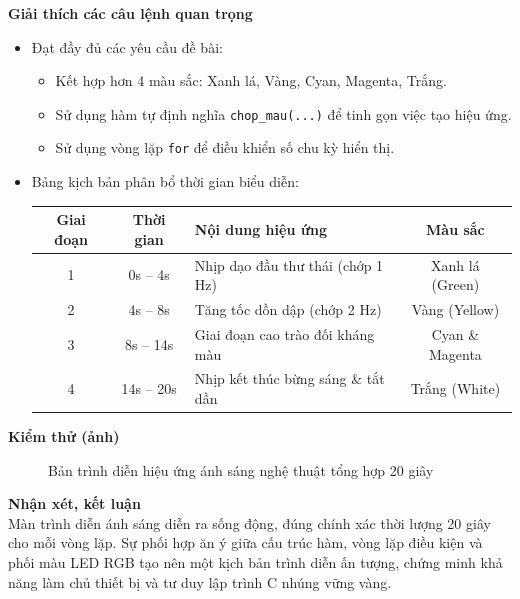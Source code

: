 \noindent\textbf{Giải thích các câu lệnh quan trọng}\\
\begin{itemize}
    \item Đạt đầy đủ các yêu cầu đề bài:
    \begin{itemize}
        \item Kết hợp hơn 4 màu sắc: Xanh lá, Vàng, Cyan, Magenta, Trắng.
        \item Sử dụng hàm tự định nghĩa \texttt{chop\_mau(...)} để tinh gọn việc tạo hiệu ứng.
        \item Sử dụng vòng lặp \texttt{for} để điều khiển số chu kỳ hiển thị.
    \end{itemize}
    \item Bảng kịch bản phân bổ thời gian biểu diễn:
    \begin{center}
    \begin{tabular}{|c|c|l|c|}
    \hline
    \textbf{Giai đoạn} & \textbf{Thời gian} & \textbf{Nội dung hiệu ứng} & \textbf{Màu sắc} \\ \hline
    1 & 0s -- 4s & Nhịp dạo đầu thư thái (chớp 1 Hz) & Xanh lá (Green) \\ \hline
    2 & 4s -- 8s & Tăng tốc dồn dập (chớp 2 Hz) & Vàng (Yellow) \\ \hline
    3 & 8s -- 14s & Giai đoạn cao trào đối kháng màu & Cyan \& Magenta \\ \hline
    4 & 14s -- 20s & Nhịp kết thúc bừng sáng \& tắt dần & Trắng (White) \\ \hline
    \end{tabular}
    \end{center}
\end{itemize}

\noindent\textbf{Kiểm thử (ảnh)}\\
\begin{figure}[H]
    \centering
    \caption{Bản trình diễn hiệu ứng ánh sáng nghệ thuật tổng hợp 20 giây}
    \label{fig:bt30}
\end{figure}

\noindent\textbf{Nhận xét, kết luận}\\
Màn trình diễn ánh sáng diễn ra sống động, đúng chính xác thời lượng 20 giây cho mỗi vòng lặp. Sự phối hợp ăn ý giữa cấu trúc hàm, vòng lặp điều kiện và phối màu LED RGB tạo nên một kịch bản trình diễn ấn tượng, chứng minh khả năng làm chủ thiết bị và tư duy lập trình C nhúng vững vàng.
